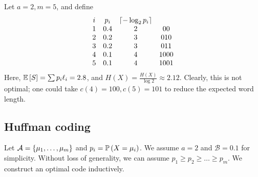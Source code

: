 \begin{example}
    Let \( a = 2, m = 5 \), and define
    \[ \begin{array}{cccc}
            i & p_i & \lceil-\log_2 p_i\rceil \\
            1 & 0.4 & 2 & 00 \\
            2 & 0.2 & 3 & 010 \\
            3 & 0.2 & 3 & 011 \\
            4 & 0.1 & 4 & 1000 \\
            5 & 0.1 & 4 & 1001
    \end{array} \]
    Here, \( \mathbb{E}\left[{S}\right] = \sum p_i \ell_i = 2.8 \), and \( H(X) = \frac{H(X)}{\log 2} \approx 2.12 \).
    Clearly, this is not optimal; one could take \( c(4) = 100, c(5) = 101 \) to reduce the expected word length.
\end{example}

\subsection{Huffman coding}
Let \( \mathcal A = \qty{\mu_1, \dots, \mu_m} \) and \( p_i = \mathbb{P}\left({X = \mu_i}\right) \).
We assume \( a = 2 \) and \( \mathcal B = \qty{0,1} \) for simplicity.
Without loss of generality, we can assume \( p_1 \geq p_2 \geq \dots \geq p_m \).
We construct an optimal code inductively.

